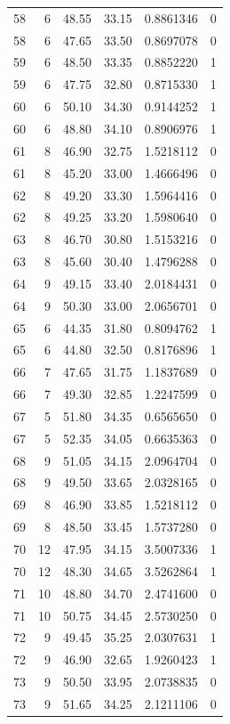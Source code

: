 \documentclass[
  letterpaper,
  DIV=11,
  numbers=noendperiod]{scrreprt}
\renewcommand{\[}{\begin{equation}}
\renewcommand{\]}{\end{equation}}
\begin{document}
\begin{table}
\begin{tabular*}{\linewidth}{@{\extracolsep{\fill}}rrrrrr}
58 & 6 & 48.55 & 33.15 & 0.8861346 & 0 \\ 
58 & 6 & 47.65 & 33.50 & 0.8697078 & 0 \\ 
59 & 6 & 48.50 & 33.35 & 0.8852220 & 1 \\ 
59 & 6 & 47.75 & 32.80 & 0.8715330 & 1 \\ 
60 & 6 & 50.10 & 34.30 & 0.9144252 & 1 \\ 
60 & 6 & 48.80 & 34.10 & 0.8906976 & 1 \\ 
61 & 8 & 46.90 & 32.75 & 1.5218112 & 0 \\ 
61 & 8 & 45.20 & 33.00 & 1.4666496 & 0 \\ 
62 & 8 & 49.20 & 33.30 & 1.5964416 & 0 \\ 
62 & 8 & 49.25 & 33.20 & 1.5980640 & 0 \\ 
63 & 8 & 46.70 & 30.80 & 1.5153216 & 0 \\ 
63 & 8 & 45.60 & 30.40 & 1.4796288 & 0 \\ 
64 & 9 & 49.15 & 33.40 & 2.0184431 & 0 \\ 
64 & 9 & 50.30 & 33.00 & 2.0656701 & 0 \\ 
65 & 6 & 44.35 & 31.80 & 0.8094762 & 1 \\ 
65 & 6 & 44.80 & 32.50 & 0.8176896 & 1 \\ 
66 & 7 & 47.65 & 31.75 & 1.1837689 & 0 \\ 
66 & 7 & 49.30 & 32.85 & 1.2247599 & 0 \\ 
67 & 5 & 51.80 & 34.35 & 0.6565650 & 0 \\ 
67 & 5 & 52.35 & 34.05 & 0.6635363 & 0 \\ 
68 & 9 & 51.05 & 34.15 & 2.0964704 & 0 \\ 
68 & 9 & 49.50 & 33.65 & 2.0328165 & 0 \\ 
69 & 8 & 46.90 & 33.85 & 1.5218112 & 0 \\ 
69 & 8 & 48.50 & 33.45 & 1.5737280 & 0 \\ 
70 & 12 & 47.95 & 34.15 & 3.5007336 & 1 \\ 
70 & 12 & 48.30 & 34.65 & 3.5262864 & 1 \\ 
71 & 10 & 48.80 & 34.70 & 2.4741600 & 0 \\ 
71 & 10 & 50.75 & 34.45 & 2.5730250 & 0 \\ 
72 & 9 & 49.45 & 35.25 & 2.0307631 & 1 \\ 
72 & 9 & 46.90 & 32.65 & 1.9260423 & 1 \\ 
73 & 9 & 50.50 & 33.95 & 2.0738835 & 0 \\ 
73 & 9 & 51.65 & 34.25 & 2.1211106 & 0 \\ 

\end{tabular*}
\end{table}
\end{document}
